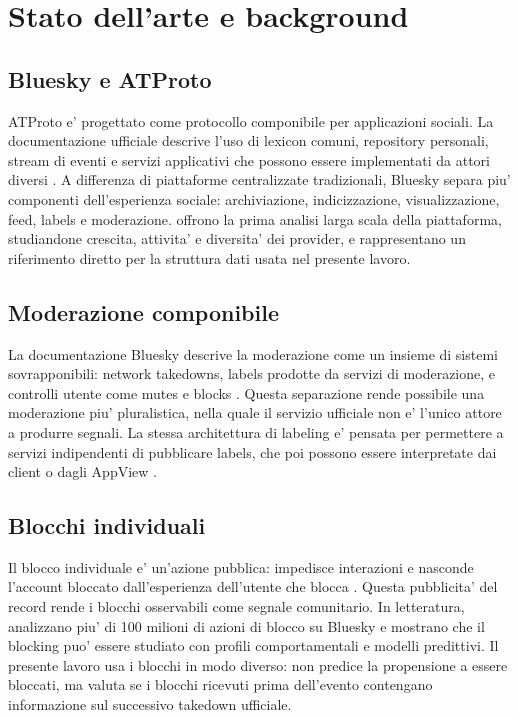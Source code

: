 \section{Stato dell'arte e background}

\subsection{Bluesky e ATProto}

ATProto e' progettato come protocollo componibile per applicazioni sociali. La documentazione ufficiale descrive l'uso di lexicon comuni, repository personali, stream di eventi e servizi applicativi che possono essere implementati da attori diversi \parencite{atprotoOverview, blueskyAtprotoDocs}. A differenza di piattaforme centralizzate tradizionali, Bluesky separa piu' componenti dell'esperienza sociale: archiviazione, indicizzazione, visualizzazione, feed, labels e moderazione. \textcite{balduf2024looking} offrono la prima analisi larga scala della piattaforma, studiandone crescita, attivita' e diversita' dei provider, e rappresentano un riferimento diretto per la struttura dati usata nel presente lavoro.

\subsection{Moderazione componibile}

La documentazione Bluesky descrive la moderazione come un insieme di sistemi sovrapponibili: network takedowns, labels prodotte da servizi di moderazione, e controlli utente come mutes e blocks \parencite{blueskyLabelsModeration}. Questa separazione rende possibile una moderazione piu' pluralistica, nella quale il servizio ufficiale non e' l'unico attore a produrre segnali. La stessa architettura di labeling e' pensata per permettere a servizi indipendenti di pubblicare labels, che poi possono essere interpretate dai client o dagli AppView \parencite{blueskyModerationArchitecture}.

\subsection{Blocchi individuali}

Il blocco individuale e' un'azione pubblica: impedisce interazioni e nasconde l'account bloccato dall'esperienza dell'utente che blocca \parencite{blueskyBlocking}. Questa pubblicita' del record rende i blocchi osservabili come segnale comunitario. In letteratura, \textcite{bono2026selfmoderation} analizzano piu' di 100 milioni di azioni di blocco su Bluesky e mostrano che il blocking puo' essere studiato con profili comportamentali e modelli predittivi. Il presente lavoro usa i blocchi in modo diverso: non predice la propensione a essere bloccati, ma valuta se i blocchi ricevuti prima dell'evento contengano informazione sul successivo takedown ufficiale.

